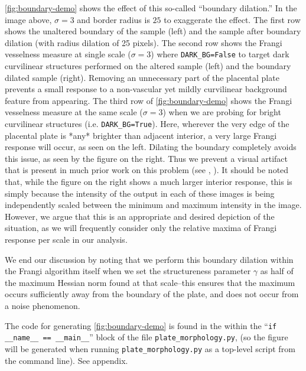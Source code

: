     \cref{fig:boundary-demo} shows the effect of this so-called ``boundary dilation.'' 
    In the image above, $\sigma=3$ and border radius is $25$ to exaggerate the effect.
    The first row shows the unaltered boundary of the sample (left) and
        the sample after boundary dilation (with radius dilation of 25 pixels).
    The second row shows the Frangi vesselness measure at single scale ($\sigma=3$) where \texttt{DARK\_BG=False} to target dark curvilinear structures performed on the altered sample (left) and the boundary dilated sample (right). Removing an unnecessary part of
    the placental plate prevents a small response to a non-vascular yet mildly curvilinear
    background feature from appearing.
    The third row of \cref{fig:boundary-demo} shows the Frangi vesselness measure at the same scale ($\sigma=3$) when we are probing for bright curvilinear structures (i.e.
    \texttt{DARK\_BG=True}). Here, wherever the very edge of the placental plate is *any* brighter than adjacent interior, a very large Frangi response will occur, as seen on the left. Dilating the boundary completely avoids this issue, as seen by the figure on the right. Thus we prevent a visual artifact that is present in much prior work on this problem (see \cite{huynh2013filter}, \cite{almoussa-ucla-reu}).
    It should be noted that, while the figure on the right shows a much larger interior response, this is simply because the intensity of the output in each of these
    images is being independently scaled between the minimum and maximum intensity in the image. However, we argue that this is an appropriate and desired depiction of the situation, as we will frequently consider only the relative maxima of Frangi response per scale in our analysis.
    
    We end our discussion by noting that we perform this boundary dilation within the
    Frangi algorithm itself when we set the structureness parameter $\gamma$ as half of the maximum Hessian norm found at that scale--this ensures that the maximum occurs sufficiently away from the boundary of the plate, and does not occur from a noise phenomenon.
    
    The code for generating \cref{fig:boundary-demo} is found in the within the ``\texttt{if \_\_name\_\_ == \_\_main\_\_}'' block of the file \texttt{plate\_morphology.py},
    (so the figure will be generated when running \texttt{plate\_morphology.py} as a top-level script from the command line). See appendix.
    
